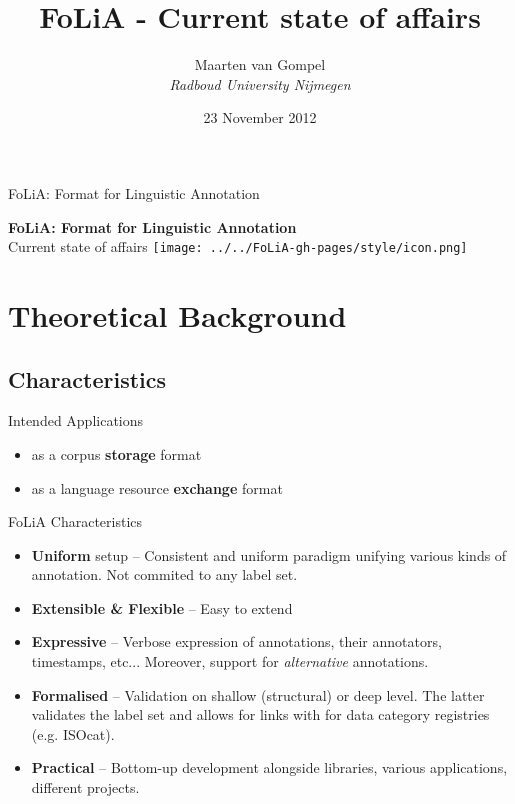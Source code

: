 \documentclass[compress]{beamer}
\title{FoLiA - Current state of affairs}
\author{Maarten van Gompel \\ \emph{Radboud University Nijmegen}}
\date{23 November 2012}
\begin{document}
\begin{frame}{FoLiA: Format for Linguistic Annotation}
	\begin{center}
		\Huge \textbf{FoLiA: Format for Linguistic Annotation} \\
		\large{Current state of affairs}
        \texttt{[image: ../../FoLiA-gh-pages/style/icon.png]}
	\end{center}
\end{frame}


\section{Theoretical Background}
\subsection{Characteristics}

\begin{frame}

	\begin{block}{Intended Applications}
		\begin{itemize}
			\item as a corpus \textbf{storage} format
			\item as a language resource \textbf{exchange} format 
		\end{itemize}				
	\end{block}

	\begin{block}{FoLiA Characteristics}
		\footnotesize
		\begin{itemize}
			\item \textbf{Uniform} setup -- Consistent and uniform paradigm unifying various kinds of annotation. Not commited to any label set.
			\item \textbf{Extensible \& Flexible} -- Easy to extend
			\item \textbf{Expressive} -- Verbose expression of annotations, their annotators, timestamps, etc... Moreover, support for \emph{alternative} annotations. 
			\item \textbf{Formalised} -- Validation on shallow (structural) or deep level. The latter validates the label set and allows for links with for data category registries (e.g. ISOcat).			
			\item \textbf{Practical} -- Bottom-up development alongside libraries, various applications, different projects.
		\end{itemize}				
	\end{block}

\end{frame}
\end{document}
